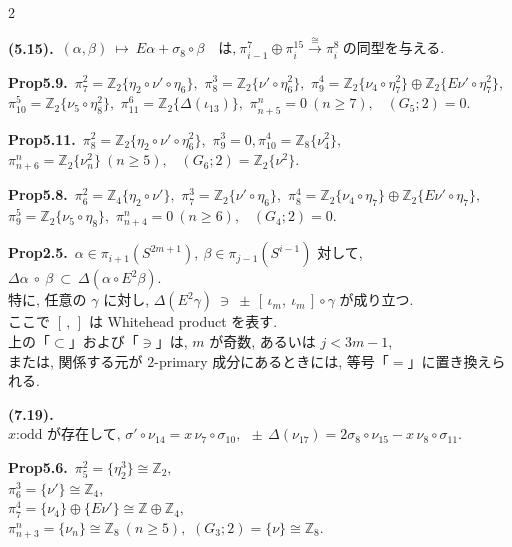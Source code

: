 \documentclass[10pt, leqno]{ltjsarticle}
\newcommand{\gen}[1]{\{#1\}}       %
\numberwithin{equation}{section}
\theoremstyle{plain}
\theoremstyle{definition}
\theoremstyle{remark}
\begin{document}
\begin{paracol}{2}
\switchcolumn

\noindent
\textbf{(5.15).}\
\((\alpha,\beta)\ \longmapsto\ E\alpha+\sigma_{8}\circ\beta
\quad\text{は,}\
\pi^{7}_{i-1}\oplus\pi^{15}_{i}\xrightarrow{\cong}\pi^{8}_{i}
\ \text{の同型を与える. }\)

\noindent
\textbf{Prop5.9.}\
\(\pi^{2}_{7}=\mathbb Z_2\gen{\eta_{2}\circ\nu'\circ\eta_6},\) \quad
\(\pi^{3}_{8}=\mathbb Z_2\gen{\nu'\circ\eta_6^2},\) \quad
\(\pi^{4}_{9}=\mathbb Z_2\gen{\nu_{4}\circ\eta_7^2}\oplus \mathbb Z_2\gen{E\nu'\circ\eta_7^2},\) \\
\(\pi^{5}_{10}=\mathbb Z_2\gen{\nu_{5}\circ\eta_8^2},\) \quad
\(\pi^{6}_{11}=\mathbb Z_2\gen{\Delta(\iota_{13})},\) \quad
\(\pi^{n}_{n+5}=0\ (n\ge7),\) \
\((G_{5};2)=0.\)

\noindent
\textbf{Prop5.11.}\
\(\pi^{2}_{8}=\mathbb Z_2\gen{\eta_{2}\circ\nu'\circ\eta_6^2},\)\quad 
\(\pi^{3}_{9}=0,\)\quad \(\pi^{4}_{10}=\mathbb Z_8\gen{\nu_{4}^2},\) \\
\(\pi^{n}_{n+6}=\mathbb Z_2\gen{\nu_n^2}\ (n\ge5),\) \
\((G_{6};2)=\mathbb Z_2\gen{\nu^2}.\)

\noindent
\textbf{Prop5.8.}\
\(\pi^{2}_{6}=\mathbb Z_4\gen{\eta_{2}\circ\nu'},\) \quad
\(\pi^{3}_{7}=\mathbb Z_2\gen{\nu'\circ\eta_6},\) \quad
\(\pi^{4}_{8}=\mathbb Z_2\gen{\nu_{4}\circ\eta_7}\oplus \mathbb Z_2\gen{E\nu'\circ\eta_7},\) \\
\(\pi^{5}_{9}=\mathbb Z_2\gen{\nu_{5}\circ\eta_8},\) \quad
\(\pi^{n}_{n+4}=0\ (n\ge6),\) \
\((G_{4};2)=0.\)

\noindent
\textbf{Prop2.5.}\
$\alpha\in\pi_{i+1}(S^{2m+1}), \ \beta\in \pi_{j-1}(S^{i-1})$ 対して, 
\(
\Delta\alpha\ \circ\ \beta\ \subset\ \Delta(\alpha\circ E^2\beta).
\)\\
特に, 任意の $\gamma$ に対し,
\(
\Delta(E^2\gamma)\ \ni\ \pm\,[\,\iota_m,\ \iota_m\,]\circ\gamma
\)
が成り立つ. \\
ここで $[\, ,\,]$ は Whitehead product を表す. \\
上の「$\subset$」および「$\ni$」は, $m$ が奇数, 
あるいは $j<3m-1$, \\
または, 関係する元が \(2\)-primary 成分にあるときには, 
等号「$=$」に置き換えられる. 

\noindent
\textbf{(7.19).}\
\(x \text{:odd が存在して, }
\sigma'\circ \nu_{14}=x\,\nu_{7}\circ\sigma_{10},\ \
\pm\,\Delta(\nu_{17})=2\sigma_{8}\circ \nu_{15}-x\,\nu_{8}\circ\sigma_{11} .\)

\noindent
\textbf{Prop5.6.}\
\(\pi^{2}_{5}=\gen{\eta_{2}^{3}}\cong \mathbb Z_{2},\) \\
\(\pi^{3}_{6}=\gen{\nu'}\cong \mathbb Z_{4},\) \\
\(\pi^{4}_{7}=\gen{\nu_{4}}\oplus \gen{E\nu'}\cong \mathbb Z\oplus\mathbb Z_{4},\) \\
\(\pi^{n}_{n+3}=\gen{\nu_{n}}\cong \mathbb Z_{8}\ (n\ge5),\)\qquad
\((G_{3};2)=\gen{\nu}\cong \mathbb Z_{8}.\)


\end{paracol}
\end{document}
